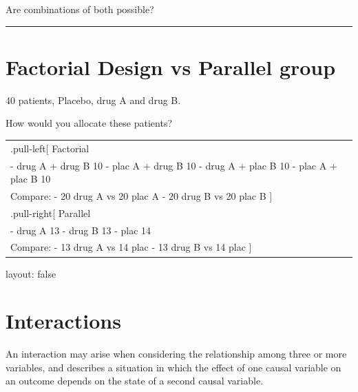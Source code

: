 \documentclass[]{article}
\begin{document}
Are combinations of both possible?

\begin{center}\rule{0.5\linewidth}{\linethickness}\end{center}

\hypertarget{factorial-design-vs-parallel-group}{%
\section{Factorial Design vs Parallel
group}\label{factorial-design-vs-parallel-group}}

40 patients, Placebo, drug A and drug B.

How would you allocate these patients?

\begin{longtable}[]{@{}l@{}}
\toprule
\endhead
\begin{minipage}[t]{0.04\columnwidth}\raggedright
.pull-left{[} Factorial\strut
\end{minipage}\tabularnewline
\begin{minipage}[t]{0.04\columnwidth}\raggedright
- drug A + drug B 10 - plac A + drug B 10 - drug A + plac B 10 - plac A
+ plac B 10\strut
\end{minipage}\tabularnewline
\begin{minipage}[t]{0.04\columnwidth}\raggedright
Compare: - 20 drug A vs 20 plac A - 20 drug B vs 20 plac B {]}\strut
\end{minipage}\tabularnewline
\begin{minipage}[t]{0.04\columnwidth}\raggedright
.pull-right{[} Parallel\strut
\end{minipage}\tabularnewline
\begin{minipage}[t]{0.04\columnwidth}\raggedright
- drug A 13 - drug B 13 - plac 14\strut
\end{minipage}\tabularnewline
\begin{minipage}[t]{0.04\columnwidth}\raggedright
Compare: - 13 drug A vs 14 plac - 13 drug B vs 14 plac {]}\strut
\end{minipage}\tabularnewline
\bottomrule
\end{longtable}

layout: false

\hypertarget{interactions}{%
\section{Interactions}\label{interactions}}

An interaction may arise when considering the relationship among three
or more variables, and describes a situation in which the effect of one
causal variable on an outcome depends on the state of a second causal
variable.
\end{document}
